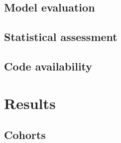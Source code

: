 \documentclass[10pt,letterpaper]{article}
\begin{document}
\subsection*{Model evaluation}


\subsection*{Statistical assessment}


\subsection*{Code availability}


\section*{Results}

\subsection*{Cohorts}

\end{document}
